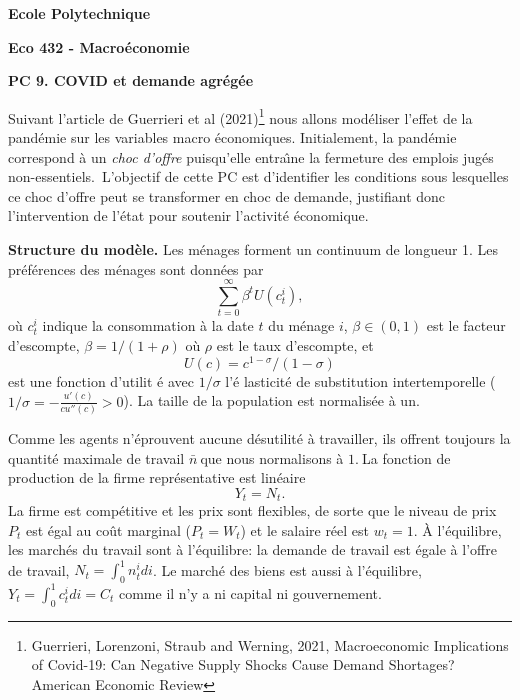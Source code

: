 \documentclass[11pt,a4paper]{article}
\begin{document}
\begin{center}
\textbf{Ecole Polytechnique}

\bigskip

\textbf{Eco 432 - Macro\'{e}conomie}

\bigskip

\textbf{PC 9. COVID et demande agr\'{e}g\'{e}e}

\hspace{1.0in}
\end{center}

\bigskip

Suivant l'article de Guerrieri et al (2021)\footnote{Guerrieri, Lorenzoni, Straub
and Werning, 2021, Macroeconomic Implications of Covid-19: Can Negative Supply Shocks Cause Demand Shortages? American Economic Review} nous allons mod\'{e}liser l'effet de la pand\'{e}mie sur les variables macro%
\'{e}conomiques. Initialement, la pand\'{e}mie correspond \`{a} un \textit{%
choc d'offre} puisqu'elle entra\^{\i}ne la fermeture des emplois jug\'{e}s
non-essentiels.\ L'objectif de cette PC est d'identifier les conditions
sous lesquelles ce choc d'offre peut se transformer en choc de demande,
justifiant donc l'intervention de l'\'{e}tat pour soutenir l'activit\'{e} 
\'{e}conomique.


\bigskip

\textbf{Structure du mod\`{e}le.} Les m\'{e}nages forment un continuum de longueur 1.  Les pr\'{e}f\'{e}rences des m\'{e}nages sont
donn\'{e}es par%
\[
\sum_{t=0}^{\infty }\beta ^{t}U\left( c_{t}^{i}\right) ,
\]%
o\`{u} $c_{t}^{i}$ indique la consommation \`{a} la date $t$ du m\'{e}nage $i$, 
$\beta\in \left( 0,1\right) $ est le facteur d'escompte, $\beta =1/(1+\rho)$ o\`{u} $\rho$ est le taux d'escompte,  et \begin{equation}U\left(
c\right) =c^{1-\sigma }/\left( 1-\sigma \right) 
\end{equation} est une fonction d'utilit%
\'{e} avec $1/\sigma$ l'\'{e}%
lasticit\'{e} de substitution  intertemporelle ($1/\sigma=-\frac{u'(c)}{ cu''(c)}>0$).
La taille de la population est normalis\'{e}e \`{a} un.  




Comme les agents n'\'{e}prouvent aucune d\'{e}sutilit\'{e} \`{a} travailler,
ils offrent toujours la quantit\'{e} maximale de travail $\bar{n}\ $que nous
normalisons \`{a} $1.\ $La fonction de production de la firme repr\'{e}sentative est lin\'{e}aire%
\[
Y_{t}=N_{t}. 
\]
La firme est comp\'{e}titive et les prix sont flexibles, de sorte que le niveau de prix $P_t $ est \'{e}gal au co\^{u}t marginal ($P_t=W_t$) et le salaire r\'{e}el est $ w_t = 1 $. \`{A} l'\'{e}quilibre, les march\'{e}s du travail sont \`{a} l'\'{e}quilibre: la demande de travail est \'{e}gale \`{a} l'offre de travail, $ N_ {t} = \int_ {0}^{1} n_{t}^{i} di $. Le march\'{e} des biens est aussi \`{a} l'\'{e}quilibre, $ Y_t = \int_ { 0}^{1} c_{t}^{i} di = C_t $ comme il n'y a ni capital ni gouvernement.
\end{document}
